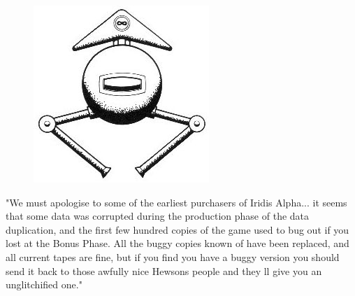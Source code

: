 \begin{definition}
\setlength{\intextsep}{0pt}%
\setlength{\columnsep}{3pt}%
\begin{figure}
\includegraphics[width=\linewidth]{src/callout/ia.jpg} 
\end{figure}
\small
"We must apologise to some of the earliest purchasers of Iridis Alpha... it
seems that some data was corrupted during the production phase of the
data duplication, and the first few hundred copies of the game used to bug
out if you lost at the Bonus Phase. All the buggy copies known of have
been replaced, and all current tapes are fine, but if you find you have a
buggy version you should send it back to those awfully nice Hewsons
people and they ll give you an unglitchified one."
\end{definition}

